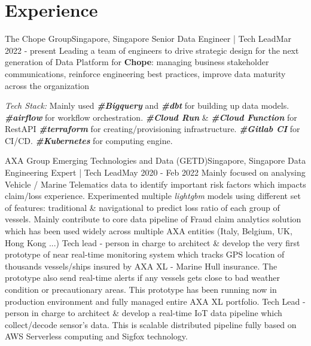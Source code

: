 \section{Experience}
  \resumeSubHeadingListStart

    \resumeSubheading
      {The Chope Group}{Singapore, Singapore}
      {Senior Data Engineer | Tech Lead}{Mar 2022 - present}
      \resumeItemListStart
          {Leading a team of engineers to drive strategic design for the next generation of Data Platform  for \textbf{Chope}: managing business stakeholder communications, reinforce engineering best practices, improve data maturity across the organization}
      \resumeItemListEnd

      \emph{Tech Stack:}
      \resumeItemListStart
          {Mainly used \textbf{\emph{\#Bigquery}} and \textbf{\emph{\#dbt}} for building up data models. \textbf{\emph{\#airflow}} for workflow orchestration. \textbf{\emph{\#Cloud Run}} \& \textbf{\emph{\#Cloud Function}} for RestAPI}
          {\textbf{\emph{\#terraform}} for creating/provisioning infrastructure. \textbf{\emph{\#Gitlab CI}} for CI/CD. \textbf{\emph{\#Kubernetes}} for computing engine}.
      \resumeItemListEnd

    \resumeSubheading
      {AXA Group Emerging Technologies and Data (GETD)}{Singapore, Singapore}
      {Data Engineering Expert | Tech Lead}{May 2020 - Feb 2022}
      \resumeItemListStart
          {Mainly focused on analysing Vehicle / Marine Telematics data to identify important risk factors which impacts claim/loss experience. Experimented multiple \emph{lightgbm} models using different set of features: traditional \& navigational to predict loss ratio of each group of vessels.}
          {Mainly contribute to core data pipeline of Fraud claim analytics solution which has been used widely across multiple AXA entities (Italy, Belgium, UK, Hong Kong ...)}
          {Tech lead - person in charge to architect \& develop the very first prototype of near real-time monitoring system which tracks GPS location of thousands vessels/ships insured by AXA XL - Marine Hull insurance. The prototype also send real-time alerts if any vessels gets close to bad weather condition or precautionary areas. This prototype has been running now in production environment and fully managed entire AXA XL portfolio.}
          {Tech Lead - person in charge to architect \& develop a real-time IoT data pipeline which collect/decode sensor’s data. This is scalable distributed pipeline fully based on AWS Serverless computing and Sigfox technology.}
      \resumeItemListEnd

